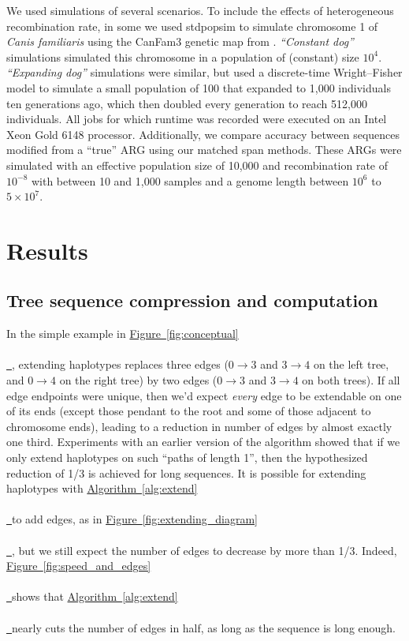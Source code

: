 \documentclass[10pt,twoside,lineno]{gsajnl}
\newcommand{\algorithmref}[2][]{%
	\hyperref[{#2}]{%
		Algorithm~\ref*{#2}%
		\ifx\\#1\\%
		\else
		\,#1%
		\fi
	}%
}
\newcommand*{\figref}[2][]{%
	\hyperref[{#2}]{%
		Figure~\ref*{#2}%
		\ifx\\#1\\%
		\else
		\,#1%
		\fi
	}%
}
\begin{document}
We used simulations of several scenarios.
To include the effects of heterogeneous recombination rate,
in some we used stdpopsim \citep{adrion2020stdpopsim} 
to simulate chromosome 1 of \textit{Canis familiaris}
using the CanFam3 genetic map from \citet{campbell2016}.
\emph{``Constant dog''} simulations simulated this chromosome in a 
population of (constant) size $10^4$.
\emph{``Expanding dog''} simulations were similar, but
used a discrete-time Wright--Fisher model to simulate
a small population of 100 that expanded to 1,000 individuals ten generations ago,
which then doubled every generation to reach 512,000 individuals.
All jobs for which runtime was recorded were executed on an Intel Xeon Gold 6148 processor.
Additionally, we compare accuracy between sequences modified from a ``true'' ARG
using our matched span methods. 
These ARGs were simulated with an effective population size of 10,000
and recombination rate of $10^{-8}$ with between 10 and 1,000 samples
and a genome length between $10^6$ to $5\times 10^7$.


\section{Results}

\subsection{Tree sequence compression and computation}


In the simple example in \figref{fig:conceptual},
extending haplotypes replaces three edges
($0 \to 3$ and $3 \to 4$ on the left tree, and $0 \to 4$ on the right tree)
by two edges ($0 \to 3$ and $3 \to 4$ on both trees).
If all edge endpoints were unique, then we'd expect \emph{every} edge to be extendable
on one of its ends
(except those pendant to the root and some of those adjacent to chromosome ends),
leading to a reduction in number of edges by almost exactly one third.
Experiments with an earlier version of the algorithm showed that
if we only extend haplotypes on such ``paths of length 1'', 
then the hypothesized reduction of 1/3 is achieved for long sequences.
It is possible for extending haplotypes with \algorithmref{alg:extend} to add edges, as in \figref{fig:extending_diagram},
but we still expect the number of edges to decrease by more than 1/3.
Indeed,
\figref{fig:speed_and_edges} shows that \algorithmref{alg:extend} nearly cuts the number of edges
in half, as long as the sequence is long enough.
\end{document}
